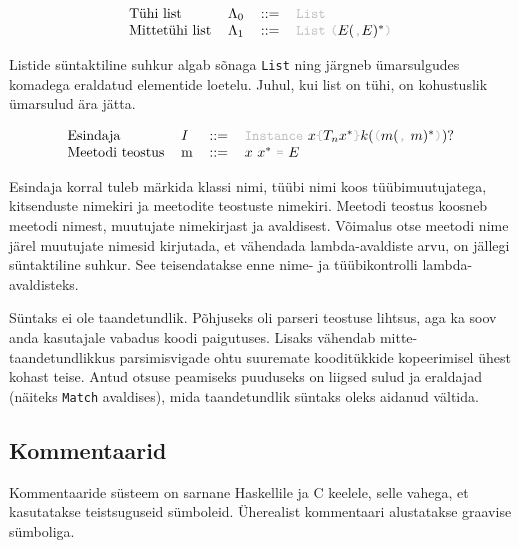 \documentclass[12pt]{article}
\begin{document}
    \begin{equation*}
      \begin{tabular}{llll}
        Tühi list      & $\Lambda_0$ & $::=$ & {\color{helehall}\verb!List!} \\
        Mittetühi list & $\Lambda_1$ & $::=$ & {\color{helehall}\verb!List!} {\color{helehall}\verb!(!}$E(${\color{helehall}\verb!,!}$E)^*${\color{helehall}\verb!)!}
      \end{tabular}
    \end{equation*}

    Listide süntaktiline suhkur algab sõnaga \verb!List! ning järgneb ümarsulgudes komadega eraldatud elementide loetelu. Juhul, kui list on tühi, on kohustuslik ümarsulud ära jätta.

    \begin{equation*}
      \begin{tabular}{llll}
        Esindaja        & $I$ & $::=$ & {\color{helehall}\verb!Instance!} $x${\color{helehall}\verb!{!}$T_n x^*${\color{helehall}\verb!}!}$k(${\color{helehall}\verb!(!}$m(${\color{helehall}\verb!,!} $m)^*${\color{helehall}\verb!)!}$)?$ \\
        Meetodi teostus & m   & $::=$ & $x$ $x^*$ {\color{helehall}\verb!=!} $E$
      \end{tabular}
    \end{equation*}

    Esindaja korral tuleb märkida klassi nimi, tüübi nimi koos tüübimuutujatega, kitsenduste nimekiri ja meetodite teostuste nimekiri. Meetodi teostus koosneb meetodi nimest, muutujate nimekirjast ja avaldisest. Võimalus otse meetodi nime järel muutujate nimesid kirjutada, et vähendada lambda-avaldiste arvu, on jällegi süntaktiline suhkur. See teisendatakse enne nime- ja tüübikontrolli lambda-avaldisteks.

    Süntaks ei ole taandetundlik. Põhjuseks oli parseri teostuse lihtsus, aga ka soov anda kasutajale vabadus koodi paigutuses. Lisaks vähendab mitte-taandetundlikkus parsimisvigade ohtu suuremate kooditükkide kopeerimisel ühest kohast teise. Antud otsuse peamiseks puuduseks on liigsed sulud ja eraldajad (näiteks \verb!Match! avaldises), mida taandetundlik süntaks oleks aidanud vältida.
    \subsection{Kommentaarid}\label{kommentaarid}
      Kommentaaride süsteem on sarnane Haskellile ja C keelele, selle vahega, et kasutatakse teistsuguseid sümboleid. Üherealist kommentaari alustatakse graavise sümboliga.
\end{document}
